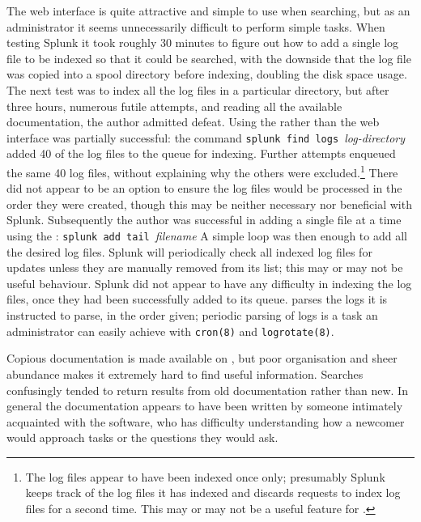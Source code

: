 The web interface is quite attractive and simple to use when searching, but
as an administrator it seems unnecessarily difficult to perform simple
tasks.  When testing Splunk it took roughly 30 minutes to figure out how to
add a single log file to be indexed so that it could be searched, with the
downside that the log file was copied into a spool directory before
indexing, doubling the disk space usage.  The next test was to index all
the log files in a particular directory, but after three hours, numerous
futile attempts, and reading all the available documentation, the author
admitted defeat.  Using the  rather than the web interface was
partially successful: the command \newline{} \tab{} \texttt{splunk find
logs }\textit{log-directory\/}\newline{} added 40 of the
\numberOFlogFILES{} log files to the queue for indexing.  Further attempts
enqueued the same 40 log files, without explaining why the others were
excluded.\footnote{The log files appear to have been indexed once only;
presumably Splunk keeps track of the log files it has indexed and discards
requests to index log files for a second time.  This may or may not be a
useful feature for \parsername{}.} There did not appear to be an option to
ensure the log files would be processed in the order they were created,
though this may be neither necessary nor beneficial with Splunk.
Subsequently the author was successful in adding a single file at a time
using the :\newline{} \tab{} \texttt{splunk add tail
}\textit{filename\/}\newline{} A simple loop was then enough to add all the
desired log files.  Splunk will periodically check all indexed log files
for updates unless they are manually removed from its list; this may or may
not be useful behaviour.  Splunk did not appear to have any difficulty in
indexing the log files, once they had been successfully added to its queue.
\parsername{} parses the logs it is instructed to parse, in the order
given; periodic parsing of logs is a task an administrator can easily
achieve with \texttt{cron(8)} and \texttt{logrotate(8)}.

Copious documentation is made available on
, but poor organisation
and sheer abundance makes it extremely hard to find useful information.
Searches confusingly tended to return results from old documentation rather
than new.  In general the documentation appears to have been written by
someone intimately acquainted with the software, who has difficulty
understanding how a newcomer would approach tasks or the questions they
would ask.

